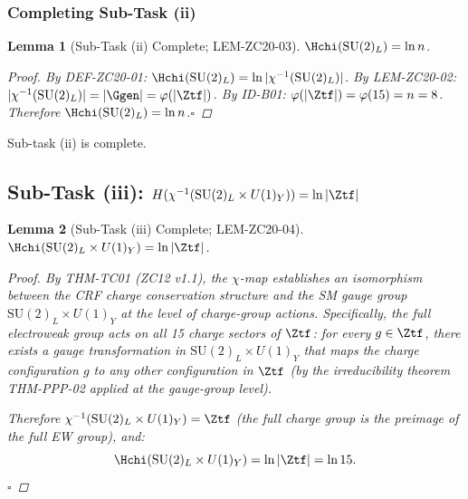 \documentclass[12pt, a4paper]{article}
\newtheorem{lemma}{Lemma}[section]
\begin{document}
\subsubsection{Completing Sub-Task (ii)}

\begin{lemma}[Sub-Task (ii) Complete; LEM-ZC20-03]
\label{zc20:lem:subtask2}
$\Hchi(\mathrm{SU}(2)_L) = \ln n$.

\begin{proof}
\sloppy
By DEF-ZC20-01: $\Hchi(\mathrm{SU}(2)_L) = \ln|\chi^{-1}(\mathrm{SU}(2)_L)|$.
By LEM-ZC20-02: $|\chi^{-1}(\mathrm{SU}(2)_L)| = |\Ggen| = \varphi(|\Ztf|)$.
By ID-B01: $\varphi(|\Ztf|) = \varphi(15) = n = 8$.
Therefore $\Hchi(\mathrm{SU}(2)_L) = \ln n$.\hfill$\square$
\end{proof}
\end{lemma}

Sub-task (ii) is complete.

\subsection{Sub-Task (iii): $H(\chi^{-1}(\mathrm{SU}(2)_L\times U(1)_Y)) = \ln|\Ztf|$}
\label{zc20:sec:ew}

\begin{lemma}[Sub-Task (iii) Complete; LEM-ZC20-04]
\label{zc20:lem:subtask3}
$\Hchi(\mathrm{SU}(2)_L\times U(1)_Y) = \ln|\Ztf|$.

\begin{proof}
By THM-TC01 (ZC12 v1.1), the $\chi$-map establishes an isomorphism
between the CRF charge conservation structure and the SM gauge group
$\mathrm{SU}(2)_L\times U(1)_Y$ at the level of charge-group actions.
Specifically, the full electroweak group acts on all 15 charge sectors
of $\Ztf$: for every $g \in \Ztf$, there exists a gauge transformation
in $\mathrm{SU}(2)_L\times U(1)_Y$ that maps the charge configuration
$g$ to any other configuration in $\Ztf$ (by the irreducibility theorem
THM-PPP-02 applied at the gauge-group level).

Therefore $\chi^{-1}(\mathrm{SU}(2)_L\times U(1)_Y) = \Ztf$ (the
full charge group is the preimage of the full EW group), and:
\[
  \Hchi(\mathrm{SU}(2)_L\times U(1)_Y) = \ln|\Ztf| = \ln 15.
\]
\hfill$\square$
\end{proof}
\end{lemma}
\end{document}
